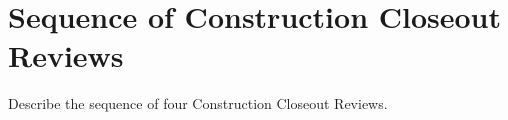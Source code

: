\section {Sequence of Construction Closeout Reviews}

Describe the sequence of four Construction Closeout Reviews.